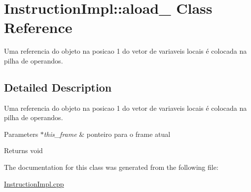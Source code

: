 \hypertarget{class_instruction_impl_1_1aload__1}{}\section{Instruction\+Impl\+:\+:aload\+\_ Class Reference}
\label{class_instruction_impl_1_1aload__1}


Uma referencia do objeto na posicao 1 do vetor de variaveis locais é colocada na pilha de operandos.  




\subsection{Detailed Description}
Uma referencia do objeto na posicao 1 do vetor de variaveis locais é colocada na pilha de operandos. 


\begin{DoxyParams}{Parameters}
{\em $\ast$this\+\_\+frame} & ponteiro para o frame atual \\
\hline
\end{DoxyParams}
\begin{DoxyReturn}{Returns}
void 
\end{DoxyReturn}


The documentation for this class was generated from the following file\+:\begin{DoxyCompactItemize}
\item 
\hyperlink{_instruction_impl_8cpp}{Instruction\+Impl.\+cpp}\end{DoxyCompactItemize}
